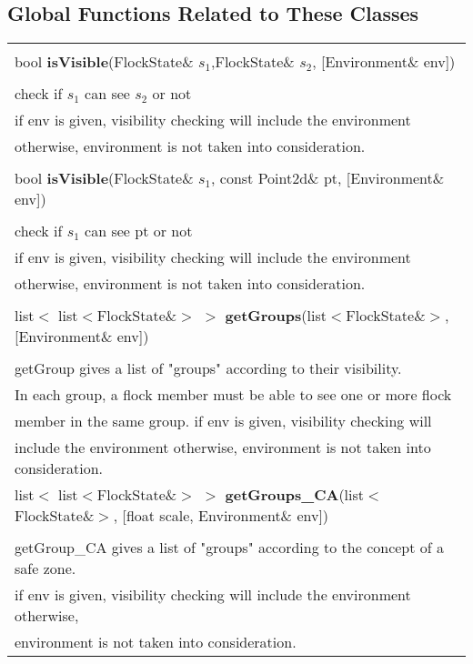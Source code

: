 \documentclass[onecolumn,10pt]{article}
\begin{document}
\subsection{Global Functions Related to These Classes}

\begin{tabular}{|l|}\hline\\
bool {\bf isVisible}(FlockState\& $s_1$,FlockState\& $s_2$, [Environment\& env]) \\\\
check if $s_1$ can see $s_2$ or not \\
if env is given, visibility checking will include the environment \\
otherwise, environment is not taken into consideration. \\\hline\hline\\

bool {\bf isVisible}(FlockState\& $s_1$, const Point2d\& pt, [Environment\& env]) \\\\
check if $s_1$ can see pt or not\\
if env is given, visibility checking will include the environment\\
otherwise, environment is not taken into consideration.\\\hline\hline\\

list$<$ list$<$FlockState\&$>$ $>$ {\bf getGroups}(list$<$FlockState\&$>$, [Environment\& env]) \\\\
getGroup gives a list of "groups" according to their visibility.\\
In each group, a flock member must be able to see one or more flock \\
member in the same group. if env is given, visibility checking will  \\
include the environment otherwise, environment is not taken into consideration.\\\hline


list$<$ list$<$FlockState\&$>$ $>$ {\bf getGroups\_CA}(list$<$FlockState\&$>$, [float scale, Environment\& env]) \\\\
getGroup\_CA gives a list of "groups" according to the concept of a safe zone.\\
if env is given, visibility checking will include the environment otherwise,\\
environment is not taken into consideration.\\\hline

\end{tabular}
\end{document}

